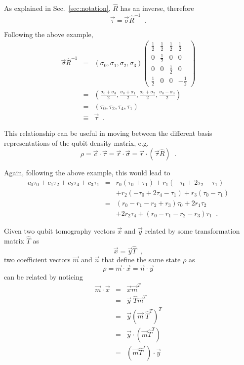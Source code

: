As explained in Sec.\ \ref{sec:notation}, $\hat{R}$ has an inverse, therefore
$$
\vec{\tau} = \vec{\sigma}\hat{R}^{-1}\;\;.
$$
\begin{example}
Following the above example,
\begin{eqnarray*}
\vec{\sigma}\hat{R}^{-1} &=& (\sigma_0,\sigma_1,\sigma_2,\sigma_3)\begin{pmatrix}
\frac{1}{2} & \frac{1}{2} & \frac{1}{2} & \frac{1}{2}\\
0 & \frac{1}{2} & 0 & 0\\
0 & 0 & \frac{1}{2} & 0\\
\frac{1}{2} & 0 & 0 & -\frac{1}{2}
\end{pmatrix}\\
&=& \left(\frac{\sigma_0+\sigma_3}{2},\frac{\sigma_0+\sigma_1}{2},\frac{\sigma_0+\sigma_2}{2},\frac{\sigma_0-\sigma_3}{2}\right)\\
&=& (\tau_0,\tau_2,\tau_4,\tau_1)\\
&\equiv& \vec{\tau}\;\;. 
\end{eqnarray*}
\end{example}
This relationship can be useful in moving between the different basis representations of the qubit density matrix, e.g.\
$$
\rho = \vec{c}\cdot\vec{\tau} = \vec{r}\cdot\vec{\sigma} = \vec{r}\cdot\left(\vec{\tau}\hat{R}\right)\;\;.
$$
\begin{example}
Again, following the above example, this would lead to 
\begin{eqnarray*}
c_0\tau_0+c_1\tau_2+c_2\tau_4+c_3\tau_1 &=& r_0\left(\tau_0+\tau_1\right)+r_1\left(-\tau_0+2\tau_2-\tau_1\right)\\
& &+r_2\left(-\tau_0+2\tau_4-\tau_1\right)+r_3\left(\tau_0-\tau_1\right)\\
&=& \left(r_0-r_1-r_2+r_3\right)\tau_0+2r_1\tau_2\\
& &+2r_2\tau_4+\left(r_0-r_1-r_2-r_3\right)\tau_1\;\;.
\end{eqnarray*}
\end{example}
Given two qubit tomography vectors $\vec{x}$ and $\vec{y}$ related by some transformation matrix $\hat{T}$ as
$$
\vec{x} = \vec{y} \hat{T}\;\;,
$$
two coefficient vectors $\vec{m}$ and $\vec{n}$ that define the same state $\rho$ as
\begin{equation}
\label{eqn:tworho}
\rho = \vec{m}\cdot\vec{x} = \vec{n}\cdot\vec{y}
\end{equation}
can be related by noticing
\begin{eqnarray*}
\vec{m}\cdot\vec{x} &=& \vec{x}\vec{m}^T\\
&=&\vec{y}\;\hat{T}\vec{m}^T\\
&=&\vec{y}\left(\vec{m}\;\hat{T}^T\right)^T\\
&=& \vec{y}\cdot\left(\vec{m}\hat{T}^T\right)\\
&=& \left(\vec{m}\hat{T}^T\right)\cdot\vec{y}
\end{eqnarray*}
